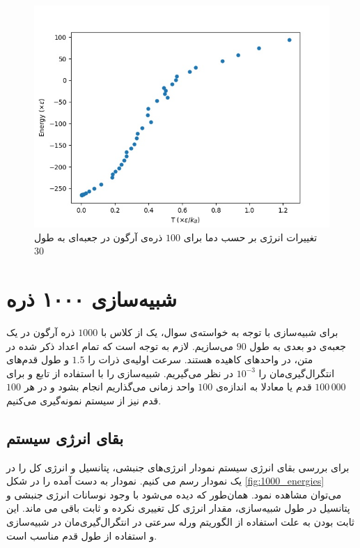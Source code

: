 \documentclass[11pt, a4paper]{article}
\begin{document}
\begin{figure}[h!]
	\centering
  \includegraphics[width=.7\textwidth]{MD_30_100_2_0.001_E_T.jpg}
  \caption{تغییرات انرژی بر حسب دما برای $100$ ذره‌ی آرگون در جعبه‌ای به طول $30$}
  \label{fig:100_E_T}
\end{figure}


\section{\textbf{شبیه‌سازی ۱۰۰۰ ذره}}
برای شبیه‌سازی با توجه به خواسته‌ی سوال، یک
از کلاس
با
$1000$
ذره آرگون در یک جعبه‌ی دو بعدی به طول
$90$
می‌سازیم.
لازم به توجه است که تمام اعداد ذکر شده در متن، در واحد‌های کاهیده هستند.
سرعت اولیه‌ی ذرات را
$1.5$
و طول قدم‌های انتگرال‌گیری‌مان را
$10^{-3}$
در نظر می‌گیریم.
شبیه‌سازی را با استفاده از تابع
و برای
$100\,000$
قدم یا معادلا به اندازه‌ی
$100$
واحد زمانی می‌گذاریم انجام بشود و در هر
$100$
قدم نیز از سیستم نمونه‌گیری می‌کنیم.


\subsection{بقای انرژی سیستم}
برای بررسی بقای انرژی سیستم نمودار انرژی‌های جنبشی، پتانسیل و انرژی کل را در یک نمودار رسم می کنیم.
نمودار به دست آمده را در شکل
\ref{fig:1000_energies}
می‌توان مشاهده نمود.
همان‌طور که دیده می‌شود با وجود نوسانات انرژی جنبشی و پتانسیل در طول شبیه‌سازی،
مقدار انرژی کل تغییری نکرده و ثابت باقی می ماند.
این ثابت بودن به علت استفاده از الگوریتم ورله سرعتی در انتگرال‌گیری‌‌مان در شبیه‌سازی و استفاده از طول قدم مناسب است.
\end{document}
